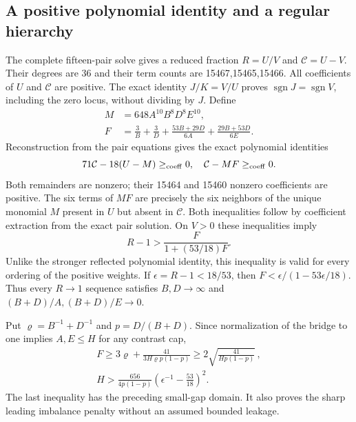 \documentclass[aps,pre,reprint,amsmath,amssymb,longbibliography]{revtex4-2}
\begin{document}
\subsection{A positive polynomial identity and a regular hierarchy}
\label{v3-app-positive-p6}
The complete fifteen-pair solve gives a reduced fraction $R=U/V$ and
$\mathcal C=U-V$. Their degrees are 36 and their term counts are 15467,15465,15466.
All coefficients of $U$ and $\mathcal C$ are positive. The exact identity
$J/K=V/U$ proves $\operatorname{sgn}J=\operatorname{sgn}V$, including the
zero locus, without dividing by $J$. Define
\begin{equation}
 \begin{aligned}
 M&=648A^{10}B^8D^8E^{10},\\
 F&=\frac3B+\frac3D+\frac{53B+29D}{6A}+\frac{29B+53D}{6E}.
 \end{aligned}
 \label{v3-eq-p6-positive-F}
\end{equation}
Reconstruction from the pair equations gives the exact polynomial identities 
 \begin{equation}
 71\mathcal C-18(U-M)\geq_{\rm coeff}0,
 \quad \mathcal C-MF\geq_{\rm coeff}0.
 \label{v3-eq-p6-positive-remainders}
\end{equation}
Both remainders are nonzero; their 15464 and 15460 nonzero coefficients are
positive. The six terms of $MF$ are precisely the six neighbors of the unique
monomial $M$ present in $U$ but absent in $\mathcal C$. Both inequalities follow by coefficient extraction from the exact pair
solution.
On $V>0$ these inequalities imply
\begin{equation}
 R-1>\frac{F}{1+(53/18)F}.
 \label{v3-eq-p6-global-bound}
\end{equation}
Unlike the stronger reflected polynomial identity, this inequality is valid for
every ordering of the positive weights. If $\epsilon=R-1<18/53$, then
$F<\epsilon/(1-53\epsilon/18)$. Thus every $R\to1$ sequence satisfies
$B,D\to\infty$ and $(B+D)/A,(B+D)/E\to0$.

Put $\varrho=B^{-1}+D^{-1}$ and $p=D/(B+D)$. Since normalization of the
bridge to one implies $A,E\leq H$ for any contrast cap,
\begin{equation}
 \begin{gathered}
 F\ge3\varrho+\frac{41}{3H\varrho p(1-p)}
       \ge2\sqrt{\frac{41}{Hp(1-p)}}\,,\\
 H>\frac{656}{4p(1-p)}
             \left(\epsilon^{-1}-\frac{53}{18}\right)^2.
 \end{gathered}
 \label{v3-eq-p6-global-budget}
\end{equation}
The last inequality has the preceding small-gap domain. It also proves the
sharp leading imbalance penalty without an assumed bounded leakage.
\end{document}
